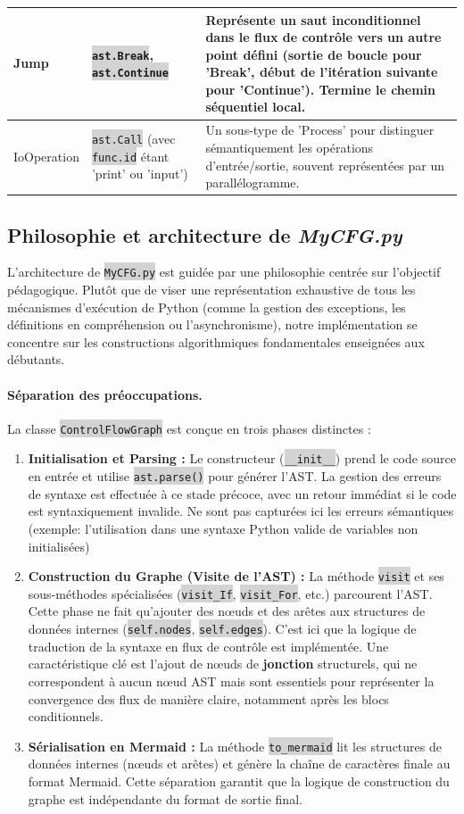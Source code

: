 \documentclass[11pt,a4paper]{article}
\newcommand{\code}[1]{\colorbox{lightgray}{\texttt{\small #1}}}
\begin{document}
\begin{longtable}{| p{3cm} | p{4cm} | p{8cm} |}
Jump & \code{ast.Break}, \code{ast.Continue} & Représente un saut inconditionnel dans le flux de contrôle vers un autre point défini (sortie de boucle pour 'Break', début de l'itération suivante pour 'Continue'). Termine le chemin séquentiel local. \\ \hline
IoOperation & \code{ast.Call} (avec \code{func.id} étant 'print' ou 'input') & Un sous-type de 'Process' pour distinguer sémantiquement les opérations d'entrée/sortie, souvent représentées par un parallélogramme. \\ \hline
\end{longtable}

\subsection{Philosophie et architecture de \textit{MyCFG.py}}

L'architecture de \code{MyCFG.py} est guidée par une philosophie centrée sur l'objectif pédagogique. Plutôt que de viser une représentation exhaustive de tous les mécanismes d'exécution de Python (comme la gestion des exceptions, les définitions en compréhension ou l'asynchronisme), notre implémentation se concentre sur les constructions algorithmiques fondamentales enseignées aux débutants.

\paragraph{Séparation des préoccupations.} La classe \code{ControlFlowGraph} est conçue en trois phases distinctes :
\begin{enumerate}
    \item \textbf{Initialisation et Parsing :} Le constructeur (\code{\_\_init\_\_}) prend le code source en entrée et utilise \code{ast.parse()} pour générer l'AST. La gestion des erreurs de syntaxe est effectuée à ce stade précoce, avec un retour immédiat si le code est syntaxiquement invalide. Ne sont pas capturées ici les erreurs sémantiques (exemple: l'utilisation dans une syntaxe Python valide de variables non initialisées)
    \item \textbf{Construction du Graphe (Visite de l'AST) :} La méthode \code{visit} et ses sous-méthodes spécialisées (\code{visit\_If}, \code{visit\_For}, etc.) parcourent l'AST. Cette phase ne fait qu'ajouter des nœuds et des arêtes aux structures de données internes (\code{self.nodes}, \code{self.edges}). C'est ici que la logique de traduction de la syntaxe en flux de contrôle est implémentée. Une caractéristique clé est l'ajout de nœuds de \textbf{jonction} structurels, qui ne correspondent à aucun nœud AST mais sont essentiels pour représenter la convergence des flux de manière claire, notamment après les blocs conditionnels.
    \item \textbf{Sérialisation en Mermaid :} La méthode \code{to\_mermaid} lit les structures de données internes (nœuds et arêtes) et génère la chaîne de caractères finale au format Mermaid. Cette séparation garantit que la logique de construction du graphe est indépendante du format de sortie final.
\end{enumerate}
\end{document}

